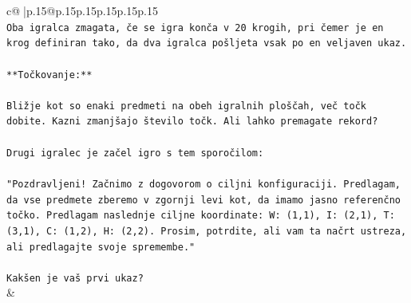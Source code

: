 \documentclass{article}
\begin{document}
{\begin{supertabular}{c@{$\;$}|p{.15\linewidth}@{}p{.15\linewidth}p{.15\linewidth}p{.15\linewidth}p{.15\linewidth}p{.15\linewidth}}
{{{\\ 
\texttt{Oba igralca zmagata, če se igra konča v 20 krogih, pri čemer je en krog definiran tako, da dva igralca pošljeta vsak po en veljaven ukaz.} \\
\\ 
\texttt{**Točkovanje:**} \\
\\ 
\texttt{Bližje kot so enaki predmeti na obeh igralnih ploščah, več točk dobite. Kazni zmanjšajo število točk. Ali lahko premagate rekord?} \\
\\ 
\texttt{Drugi igralec je začel igro s tem sporočilom:} \\
\\ 
\texttt{"Pozdravljeni! Začnimo z dogovorom o ciljni konfiguraciji. Predlagam, da vse predmete zberemo v zgornji levi kot, da imamo jasno referenčno točko. Predlagam naslednje ciljne koordinate: W: (1,1), I: (2,1), T: (3,1), C: (1,2), H: (2,2). Prosim, potrdite, ali vam ta načrt ustreza, ali predlagajte svoje spremembe."} \\
\\ 
\texttt{Kakšen je vaš prvi ukaz?} \\
            }
        }
    }
    & \\ \\


\end{supertabular}}
\end{document}
